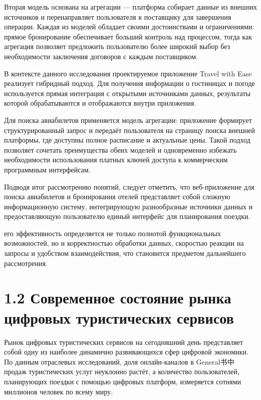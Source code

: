 \documentclass[14pt,a4paper,oneside]{extreport}
\begin{document}
Вторая модель основана на агрегации — платформа собирает данные из внешних источников и перенаправляет пользователя к поставщику для завершения операции. Каждая из моделей обладает своими достоинствами и ограничениями: прямое бронирование обеспечивает больший контроль над процессом, тогда как агрегация позволяет предложить пользователю более широкий выбор без необходимости заключения договоров с каждым поставщиком.

В контексте данного исследования проектируемое приложение Travel with Ease реализует гибридный подход. Для получения информации о гостиницах и погоде используется прямая интеграция с открытыми источниками данных, результаты которой обрабатываются и отображаются внутри приложения.

Для поиска авиабилетов применяется модель агрегации: приложение формирует структурированный запрос и передаёт пользователя на страницу поиска внешней платформы, где доступны полное расписание и актуальные цены. Такой подход позволяет сочетать преимущества обеих моделей и одновременно избежать необходимости использования платных ключей доступа к коммерческим программным интерфейсам.

Подводя итог рассмотрению понятий, следует отметить, что веб-приложение для поиска авиабилетов и бронирования отелей представляет собой сложную информационную систему, интегрирующую разнообразные источники данных и предоставляющую пользователю единый интерфейс для планирования поездки.

его эффективность определяется не только полнотой функциональных возможностей, но и корректностью обработки данных, скоростью реакции на запросы и удобством взаимодействия, что становится предметом дальнейшего рассмотрения.


\section*{1.2 Современное состояние рынка цифровых туристических сервисов}

Рынок цифровых туристических сервисов на сегодняшний день представляет собой одну из наиболее динамично развивающихся сфер цифровой экономики. По данным отраслевых исследований, доля онлайн-каналов в General书中 продаж туристических услуг неуклонно растёт, а количество пользователей, планирующих поездки с помощью цифровых платформ, измеряется сотнями миллионов человек по всему миру.
\end{document}
